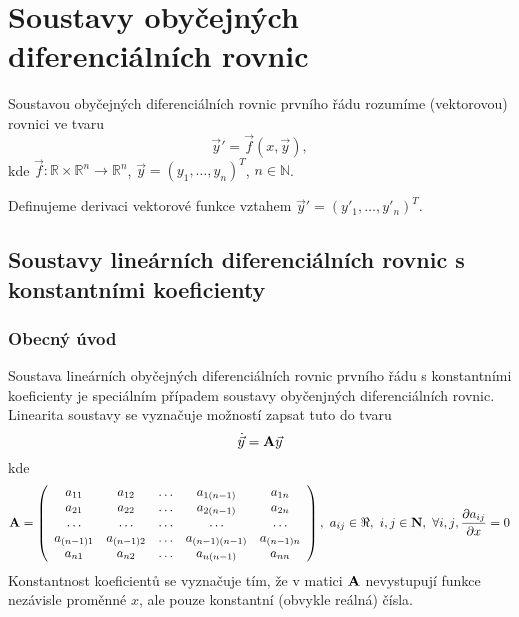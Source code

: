 
\chapter{Soustavy obyčejných diferenciálních rovnic}
Soustavou obyčejných diferenciálních rovnic prvního řádu rozumíme (vektorovou) rovnici ve tvaru
\[
   \vec{y}' = \vec{f}(x,\vec{y}),
\]
kde $\vec{f}:\mathbb{R}\times\mathbb{R}^n\rightarrow\mathbb{R}^n$, $\vec{y}=(y_1,\ldots,y_n)^T$, $n\in\mathbb{N}$.

Definujeme derivaci vektorové funkce vztahem $\vec{y}'=(y'_1,\ldots,y'_n)^T$.


\section{Soustavy lineárních diferenciálních rovnic s konstantními koeficienty}
\subsection{Obecný úvod}
Soustava lineárních obyčejných diferenciálních rovnic prvního řádu %
s konstantními koeficienty je speciálním případem soustavy obyčenjných diferenciálních rovnic. %
Linearita soustavy se vyznačuje možností zapsat tuto do tvaru 
\begin{equation}\label{EQ:soustava}
  \dot{\vec{y}} = {\bf A} \vec{y}%
\end{equation}
kde 
\[
 {\bf A} = 
  \left(
    \begin{array}{ccccc}
     a_{11} & a_{12} & \ldots & a_{1(n-1)} & a_{1n} \\
     a_{21} & a_{22} & \ldots & a_{2(n-1)} & a_{2n} \\
     \ldots & \ldots & \ldots & \ldots & \ldots \\
     a_{(n-1)1} & a_{(n-1)2} & \ldots & a_{(n-1)(n-1)} & a_{(n-1)n} \\
     a_{n1} & a_{n2} & \ldots & a_{n(n-1)} & a_{nn} \\
    \end{array}
  \right),~a_{ij}\in\Re,~i,j\in{\bf N},~\forall{i,j},\frac{\partial a_{ij}}{\partial x} = 0
\]
Konstantnost koeficientů se vyznačuje tím, že v matici ${\bf A}$ nevystupují funkce nezávisle proměnné $x$, ale pouze konstantní (obvykle reálná) čísla.

